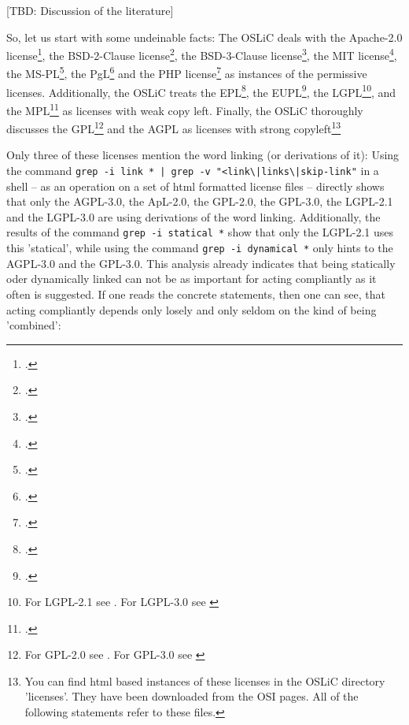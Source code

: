[TBD: Discussion of the literature]

So, let us start with some undeinable facts: The OSLiC deals with the Apache-2.0
license\footcite [cf.][\nopage wp.]{Apl20OsiLicense2004a}, the BSD-2-Clause
license\footcite [cf.][\nopage wp.]{BsdLicense2Clause}, the BSD-3-Clause
license\footcite [cf.][\nopage wp.]{BsdLicense3Clause}, the MIT license\footcite
[cf.][\nopage wp.]{MitLicense2012a}, the MS-PL\footcite [cf.][\nopage
wp.]{MsplOsiLicense2013a}, the PgL\footcite [cf.][\nopage
wp.]{PglOsiLicense2013a} and the PHP license\footcite [cf.][\nopage
wp.]{Php30OsiLicense2013a} as instances of the permissive licenses.
Additionally, the OSLiC treats the EPL\footcite [cf.][\nopage
wp.]{Epl10OsiLicense2005a}, the EUPL\footcite [cf.][\nopage
wp.]{Eupl11OsiLicense2007a}, the LGPL\footnote{For LGPL-2.1 see \cite
[cf.][\nopage wp.]{Lgpl21OsiLicense1999a}. For LGPL-3.0 see \cite [cf.][\nopage
wp.]{Lgpl30OsiLicense2007a} }, and the MPL\footcite [cf.][\nopage
wp.]{Mpl20OsiLicense2013a} as licenses with weak copy left. Finally, the OSLiC
thoroughly discusses the GPL\footnote{For GPL-2.0 see \cite [cf.][\nopage
wp.]{Gpl20OsiLicense1991a}. For GPL-3.0 see \cite [cf.][\nopage
wp.]{Gpl30OsiLicense2007a} } and the AGPL\cite [cf.][\nopage
wp.]{Agpl30OsiLicense2007a} as licenses with strong copyleft\footnote{You can
find html based instances of these licenses in the OSLiC directory 'licenses'.
They have been downloaded from the OSI pages. All of the following statements
refer to these files.}

Only three of these licenses mention the word linking (or derivations of it):
Using the command \texttt{grep -i link * | grep -v
"<link\textbackslash{}|links\textbackslash{}|skip-link"} in a shell -- as an
operation on a set of html formatted license files -- directly shows that only
the AGPL-3.0, the ApL-2.0, the GPL-2.0, the GPL-3.0, the LGPL-2.1 and the
LGPL-3.0 are using derivations of the word linking. Additionally, the results of
the command \texttt{grep -i statical *} show that only the LGPL-2.1 uses this
'statical', while using the command \texttt{grep -i dynamical *} only hints to
the AGPL-3.0 and the GPL-3.0. This analysis already indicates that being
statically oder dynamically linked can not be as important for acting
compliantly as it often is suggested.
% 
If one reads the concrete statements, then one can see, that acting compliantly
depends only losely and only seldom on the kind of being 'combined':

